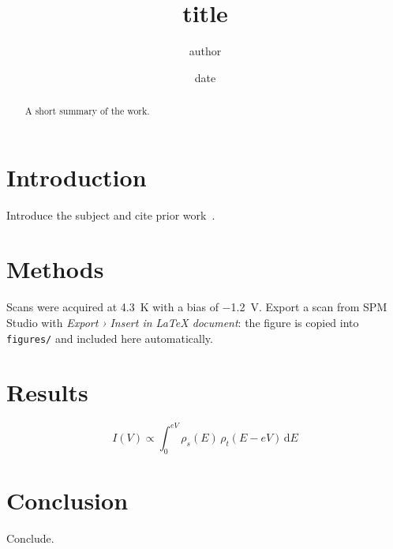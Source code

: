 \documentclass[11pt,a4paper]{article}
\title{ {{title}} }
\author{ {{author}} }
\date{ {{date}} }
\begin{document}
\maketitle

\begin{abstract}
A short summary of the work.
\end{abstract}

\section{Introduction}
Introduce the subject and cite prior work~\cite{binnig1982}.

\section{Methods}
Scans were acquired at \SI{4.3}{\kelvin} with a bias of \SI{-1.2}{\volt}.
Export a scan from SPM Studio with \emph{Export › Insert in LaTeX document}: the figure is copied
into \texttt{figures/} and included here automatically.

\section{Results}
\begin{equation}
  I(V) \propto \int_0^{eV} \rho_s(E)\,\rho_t(E - eV)\,\mathrm{d}E
  \label{eq:tunnel}
\end{equation}

\section{Conclusion}
Conclude.



\end{document}
